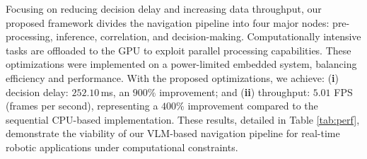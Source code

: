 



Focusing on reducing decision delay and increasing data throughput, our proposed framework divides the navigation pipeline into four major nodes: pre-processing, inference, correlation, and decision-making. Computationally intensive tasks are offloaded to the GPU to exploit parallel processing capabilities. These optimizations were implemented on a power-limited embedded system, balancing efficiency and performance. With the proposed optimizations, we achieve: (\textbf{i}) decision delay: $252.10$\,ms, an $900\%$ improvement; and (\textbf{ii}) throughput: $5.01$ FPS (frames per second), representing a $400\%$ improvement compared to the sequential CPU-based implementation. These results, detailed in Table \ref{tab:perf}, demonstrate the viability of our VLM-based navigation pipeline for real-time robotic applications under computational constraints. 

